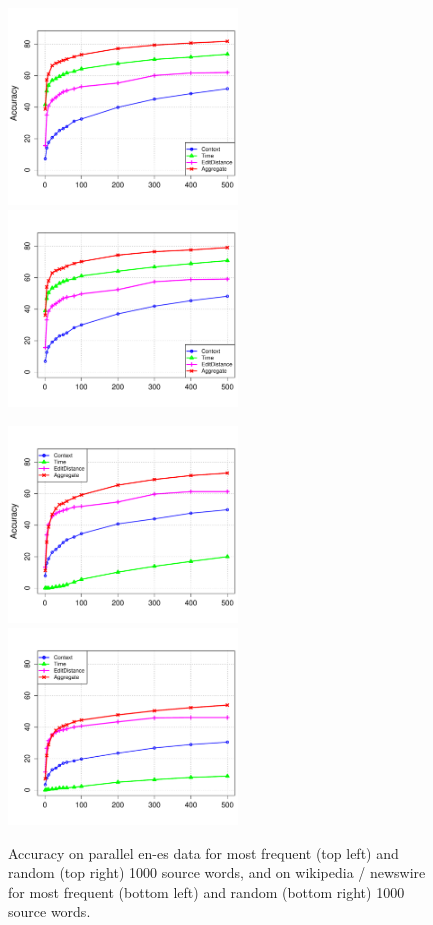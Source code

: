 \documentclass{article}
\begin{document}
\begin{figure}[h!]
\centerline{\mbox{\includegraphics[width=2.4in]{figures/exp1/parallel.freq/parfreq} \includegraphics[width=2.4in]{figures/exp1/parallel.rand/parrand}}}
\centerline{\mbox{\includegraphics[width=2.4in]{figures/exp1/wikinews.freq/wikinewsfreq} \includegraphics[width=2.4in]{figures/exp1/wikinews.rand/wikinewsrand}}}
\caption{Accuracy on parallel en-es data for most frequent (top left) and random (top right) 1000 source words, and on wikipedia / newswire for most frequent (bottom left) and random (bottom right) 1000 source words.}
\label{fig:exp1}
\end{figure}
\end{document}
